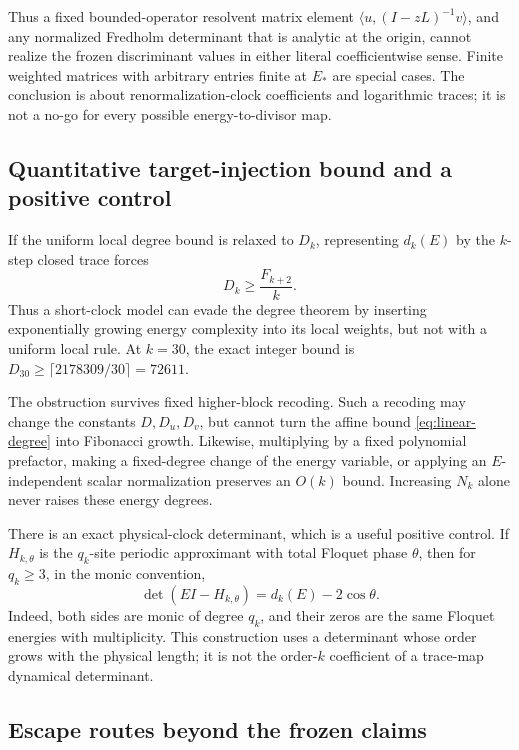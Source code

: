 Thus a fixed bounded-operator resolvent matrix element
\(\langle u,(I-zL)^{-1}v\rangle\), and any normalized Fredholm determinant
that is analytic at the origin, cannot realize the frozen discriminant values
in either literal coefficientwise sense.  Finite weighted matrices with
arbitrary entries finite at \(E_*\) are special cases.  The conclusion is
about renormalization-clock coefficients and logarithmic traces; it is not a
no-go for every possible energy-to-divisor map.

\subsection{Quantitative target-injection bound and a positive control}

If the uniform local degree bound is relaxed to \(D_k\), representing
\(d_k(E)\) by the \(k\)-step closed trace forces
\begin{equation}
D_k\ge \frac{F_{k+2}}{k}.
\label{eq:injection-bound}
\end{equation}
Thus a short-clock model can evade the degree theorem by inserting
exponentially growing energy complexity into its local weights, but not with a
uniform local rule.  At \(k=30\), the exact integer bound is
\(D_{30}\ge\lceil2178309/30\rceil=72611\).

The obstruction survives fixed higher-block recoding.  Such a recoding may
change the constants \(D,D_u,D_v\), but cannot turn the affine bound
\eqref{eq:linear-degree} into Fibonacci growth.  Likewise, multiplying by a
fixed polynomial prefactor, making a fixed-degree change of the energy
variable, or applying an \(E\)-independent scalar normalization preserves an
\(O(k)\) bound.  Increasing \(N_k\) alone never raises these energy degrees.

There is an exact physical-clock determinant, which is a useful positive
control.  If \(H_{k,\theta}\) is the \(q_k\)-site periodic approximant with
total Floquet phase \(\theta\), then for \(q_k\ge3\), in the monic convention,
\begin{equation}
\det(EI-H_{k,\theta})=d_k(E)-2\cos\theta.
\label{eq:physical-characteristic}
\end{equation}
Indeed, both sides are monic of degree \(q_k\), and their zeros are the same
Floquet energies with multiplicity.  This construction uses a determinant
whose order grows with the physical length; it is not the order-\(k\)
coefficient of a trace-map dynamical determinant.

\subsection{Escape routes beyond the frozen claims}

